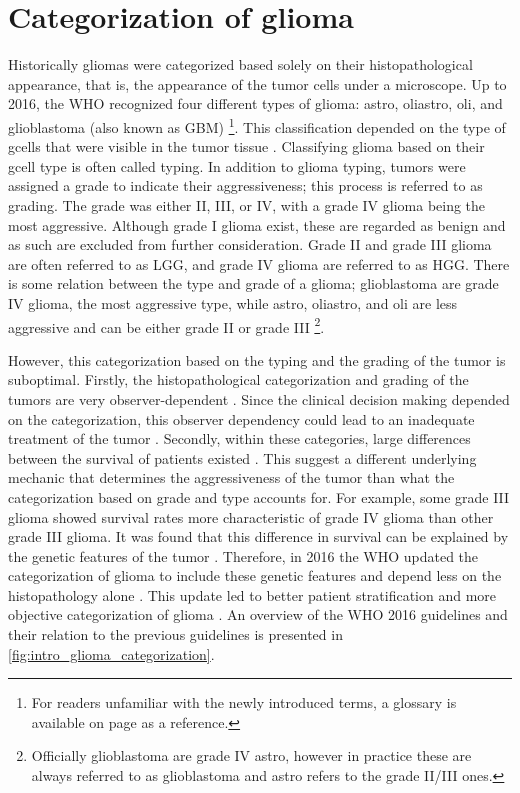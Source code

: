 \section{Categorization of glioma}
Historically \glspl{glioma} were categorized based solely on their histopathological appearance, that is, the appearance of the \gls{tumor} cells under a microscope.
Up to 2016, the \gls{WHO} recognized four different types of \gls{glioma}: \gls{astro}, \gls{oliastro}, \gls{oli}, and \gls{glioblastoma} (also known as \gls{GBM}) \footnote{For readers unfamiliar with the newly introduced terms, a glossary is available on page \pageref{glossary} as a reference.}.
This classification depended on the type of \glspl{gcell} that were visible in the \gls{tumor} tissue \autocite{louis2007who}.
Classifying \gls{glioma} based on their \gls{gcell} type is often called typing.
In addition to \gls{glioma} typing, \glspl{tumor} were assigned a grade to indicate their aggressiveness; this process is referred to as grading.
The grade was either II, III, or IV, with a grade IV \gls{glioma} being the most aggressive.
Although grade I \gls{glioma} exist, these are regarded as benign and as such are excluded from further consideration.
Grade II and grade III \gls{glioma} are often referred to as \gls{LGG}, and grade IV \gls{glioma} are referred to as \gls{HGG}.
There is some relation between the type and grade of a glioma; \gls{glioblastoma} are grade IV glioma, the most aggressive type, while \gls{astro}, \gls{oliastro}, and \gls{oli} are less aggressive and can be either grade II or grade III \footnote{Officially \gls{glioblastoma} are grade IV \gls{astro}, however in practice these are always referred to as \gls{glioblastoma} and \gls{astro} refers to the grade II/III ones.}.

However, this categorization based on the typing and the grading of the \gls{tumor} is suboptimal.
Firstly, the histopathological categorization and grading of the \glspl{tumor} are very observer-dependent \autocite{mittler1996gradingreliability, vandenbent2010interobserver}.
Since the clinical decision making depended on the categorization, this observer dependency could lead to an inadequate treatment of the \gls{tumor} \autocite{vandenbent2010interobserver}.
Secondly, within these categories, large differences between the survival of patients existed  \autocite{dubbink2015molecular}.
This suggest a different underlying mechanic that determines the aggressiveness of the \gls{tumor} than what the categorization based on grade and type accounts for.
For example, some grade III \gls{glioma} showed survival rates more characteristic of grade IV \gls{glioma} than other grade III \gls{glioma}.
It was found that this difference in survival can be explained by the genetic features of the \gls{tumor} \autocite{dubbink2015molecular,eckel2015gliomagroups}.
Therefore, in 2016 the \gls{WHO} updated the categorization of \gls{glioma} to include these genetic features and depend less on the histopathology alone \cite{louis20162016}.
This update led to better patient stratification and more objective categorization of \gls{glioma} \autocite{molinaro2019geneticepidemiology}.
An overview of the \gls{WHO} 2016 guidelines and their relation to the previous guidelines is presented in \cref{fig:intro_glioma_categorization}.


